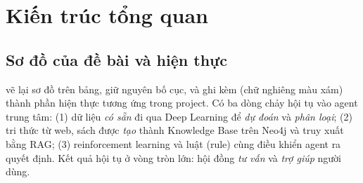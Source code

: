 \chapter{Kiến trúc tổng quan}
\label{chap:arch}

\section{Sơ đồ của đề bài và hiện thực}

 vẽ lại sơ đồ trên bảng, giữ nguyên bố cục, và ghi kèm (chữ nghiêng màu xám) thành phần hiện thực tương ứng trong project. Có ba dòng chảy hội tụ vào agent trung tâm: (1) dữ liệu \emph{có sẵn} đi qua Deep Learning để \emph{dự đoán} và \emph{phân loại}; (2) tri thức từ web, sách được \emph{tạo} thành Knowledge Base trên Neo4j và truy xuất bằng RAG; (3) reinforcement learning và luật (rule) cùng điều khiển agent ra quyết định. Kết quả hội tụ ở vòng tròn lớn: hội đồng \emph{tư vấn} và \emph{trợ giúp} người dùng.


